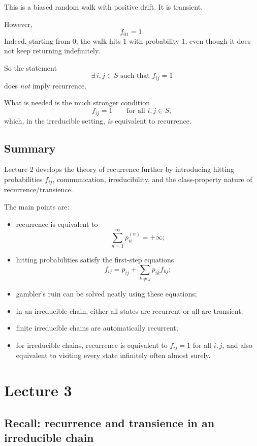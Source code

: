 \documentclass[11pt]{article}
\theoremstyle{definition}
\begin{document}
This is a biased random walk with positive drift. It is transient.

However,
\[
f_{01}=1.
\]
Indeed, starting from \(0\), the walk hits \(1\) with probability \(1\), even though it does not keep returning indefinitely.

So the statement
\[
\exists\, i,j\in S \text{ such that } f_{ij}=1
\]
does \emph{not} imply recurrence.

What is needed is the much stronger condition
\[
f_{ij}=1 \qquad \text{for all } i,j\in S,
\]
which, in the irreducible setting, \emph{is} equivalent to recurrence.

\subsection{Summary}

\begin{summarybox}
Lecture 2 develops the theory of recurrence further by introducing hitting probabilities \(f_{ij}\), communication, irreducibility, and the class-property nature of recurrence/transience.

The main points are:
\begin{itemize}[leftmargin=2em]
    \item recurrence is equivalent to
    \[
    \sum_{n=1}^\infty p_{ii}^{(n)}=+\infty;
    \]
    \item hitting probabilities satisfy the first-step equations
    \[
    f_{ij}=p_{ij}+\sum_{k\neq j} p_{ik}f_{kj};
    \]
    \item gambler's ruin can be solved neatly using these equations;
    \item in an irreducible chain, either all states are recurrent or all are transient;
    \item finite irreducible chains are automatically recurrent;
    \item for irreducible chains, recurrence is equivalent to \(f_{ij}=1\) for all \(i,j\), and also equivalent to visiting every state infinitely often almost surely.
\end{itemize}
\end{summarybox}

\clearpage

\section{Lecture 3}

\subsection{Recall: recurrence and transience in an irreducible chain}
\end{document}
